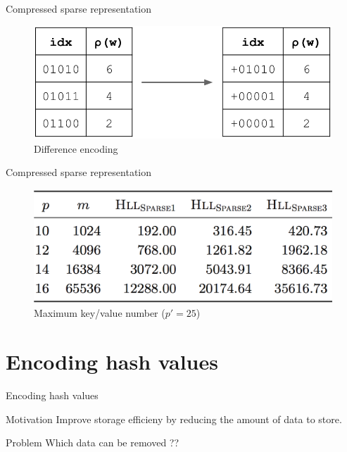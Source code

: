 \documentclass{beamer}
\begin{document}
\begin{frame}{Compressed sparse representation}

  \begin{figure}[c]
    \includegraphics [scale=0.5]  {hyperloglog_difference.png}
    \caption{Difference encoding}
  \end{figure}


\end{frame}

\begin{frame}{Compressed sparse representation}

  \begin{figure}[c]
    \includegraphics [scale=0.45]  {sparse123.png}
    \caption{Maximum key/value number ($p' = 25$)}
  \end{figure}

\end{frame}


\section{Encoding hash values}
\begin{frame}{Encoding hash values}

  \begin{block}{Motivation}
    Improve storage efficieny by reducing the amount of data to store.
  \end{block}

  \begin{alertblock}{Problem}
    Which data can be removed ??
  \end{alertblock}

\end{frame}
\end{document}
